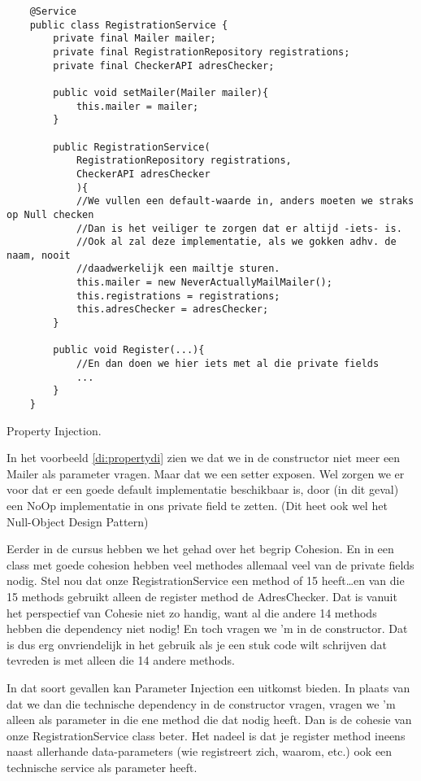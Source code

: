 \begin{listing}[H]
    \begin{verbatim}
    @Service
    public class RegistrationService {
        private final Mailer mailer;
        private final RegistrationRepository registrations;
        private final CheckerAPI adresChecker;

        public void setMailer(Mailer mailer){
            this.mailer = mailer;
        }

        public RegistrationService(
            RegistrationRepository registrations,
            CheckerAPI adresChecker
            ){
            //We vullen een default-waarde in, anders moeten we straks op Null checken
            //Dan is het veiliger te zorgen dat er altijd -iets- is.
            //Ook al zal deze implementatie, als we gokken adhv. de naam, nooit
            //daadwerkelijk een mailtje sturen.
            this.mailer = new NeverActuallyMailMailer();
            this.registrations = registrations;
            this.adresChecker = adresChecker;
        }

        public void Register(...){
            //En dan doen we hier iets met al die private fields
            ...
        }
    }
    \end{verbatim}
    \caption{Property Injection.}
    \label{di:propertydi}
\end{listing}

In het voorbeeld \ref{di:propertydi} zien we dat we in de constructor niet meer een Mailer als
parameter vragen. Maar dat we een setter exposen. Wel zorgen we er voor dat er een goede default
implementatie beschikbaar is, door (in dit geval) een NoOp implementatie in ons private field te zetten.
(Dit heet ook wel het Null-Object Design Pattern)

Eerder in de cursus hebben we het gehad over het begrip Cohesion. En in een class met goede cohesion
hebben veel methodes allemaal veel van de private fields nodig. Stel nou dat onze RegistrationService
een method of 15 heeft\ldots en van die 15 methods gebruikt alleen de register method de AdresChecker.
Dat is vanuit het perspectief van Cohesie niet zo handig, want al die andere 14 methods hebben
die dependency niet nodig! En toch vragen we 'm in de constructor. Dat is dus erg onvriendelijk
in het gebruik als je een stuk code wilt schrijven dat tevreden is met alleen die 14 andere methods.

In dat soort gevallen kan Parameter Injection een uitkomst bieden. In plaats van dat we dan 
die technische dependency in de constructor vragen, vragen we 'm alleen als parameter in die ene
method die dat nodig heeft. Dan is de cohesie van onze RegistrationService class beter. Het nadeel
is dat je register method ineens naast allerhande data-parameters (wie registreert zich, waarom, etc.)
ook een technische service als parameter heeft.

